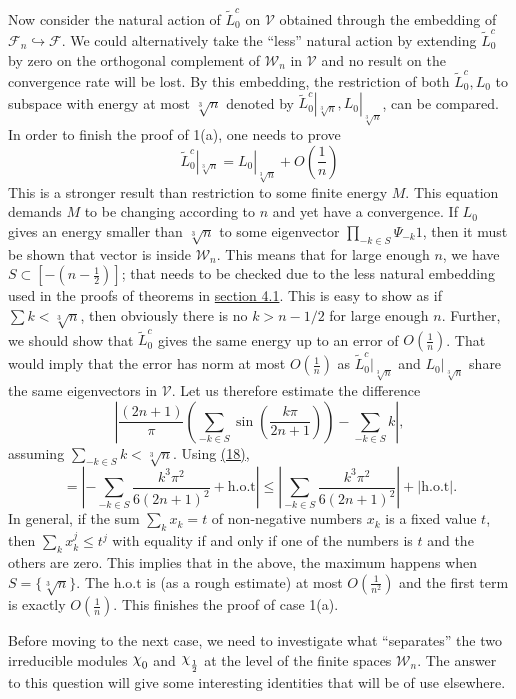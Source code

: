 \documentclass[twoside,11pt,titlepage]{amsart}
\renewcommand{\=}[1]{\stackrel{#1}{=}} %
\theoremstyle{definition}
\theoremstyle{remark}
\DeclareRobustCommand{\rchi}{{\mathpalette\irchi\relax}}
\newcommand{\irchi}[2]{\raisebox{\depth}{$#1\chi$}}
\begin{document}
Now consider the natural action of $\widetilde{L}_0^c$ on $\mathcal{V}$ obtained through the embedding of $\mathcal{F}_n \hookrightarrow \mathcal{F}$. We could alternatively take the ``less'' natural action by extending $\widetilde{L}_0^c$ by zero on the orthogonal complement of $\mathcal{W}_n$ in $\mathcal{V}$ and no result on the convergence rate will be lost. By this embedding, the restriction of both $\widetilde{L}_0^c,L_0$ to subspace with energy at most $\sqrt[3]{n}$ denoted by $\widetilde{L}_0^c|_{\sqrt[3]{n}},L_0|_{\sqrt[3]{n}}$, can be compared. In order to finish the proof of 1(a), one needs to prove
$$\widetilde{L}_0^c|_{\sqrt[3]{n}}=L_0|_{\sqrt[3]{n}}+O(\frac{1}{n})$$
This is a stronger result than restriction to some finite energy $M$. This equation demands $M$ to be changing according to $n$ and yet have a convergence. If $L_0$ gives an energy smaller than $\sqrt[3]{n}$ to some eigenvector $\prod_{-k \in S} \Psi_{-k} 1$, then it must be shown that vector is inside $\mathcal{W}_n$. This means that for large enough $n$, we have $S \subset [-(n-\frac{1}{2})]$; that needs to be checked due to the less natural embedding used in the proofs of theorems in \hyperref[4.1]{section 4.1}. This is easy to show as if $\sum k < \sqrt[3]{n}$, then obviously there is no $k>n-1/2$ for large enough $n$. Further, we should show that $\widetilde{L}_0^c$ gives the same energy up to an error of $O(\frac{1}{n})$. That would imply that the error has norm at most $O(\frac{1}{n})$ as $\widetilde{L}_0^c|_{\sqrt[3]{n}}$ and $L_0|_{\sqrt[3]{n}}$ share the same eigenvectors in $\mathcal{V}$. Let us therefore estimate the difference 
$$|\frac{(2n+1)}{\pi}(\sum_{-k \in S} \sin(\frac{k\pi}{2n+1}))-\sum_{-k \in S} k|,$$
assuming $\sum_{-k \in S}k < \sqrt[3]{n}$. Using \hyperref[eq18]{(18)},
$$=|-\sum_{-k \in S}\frac{k^3 \pi^2}{6(2n+1)^2}+\text{h.o.t}| \le |\sum_{-k \in S}\frac{k^3 \pi^2}{6(2n+1)^2}|+|\text{h.o.t}|.$$
In general, if the sum $\sum_k x_k=t$ of non-negative numbers $x_k$ is a fixed value $t$, then $\sum_k x_k^j \le t^j$ with equality if and only if one of the numbers is $t$ and the others are zero. This implies that in the above, the maximum happens when $S=\{\sqrt[3]{n}\}$. The $\text{h.o.t}$ is (as a rough estimate) at most $O(\frac{1}{n^2})$ and the first term is exactly $O(\frac{1}{n})$. This finishes the proof of case 1(a).

Before moving to the next case, we need to investigate what ``separates'' the two irreducible modules $\rchi_0$ and $\rchi_\frac{1}{2}$ at the level of the finite spaces $\mathcal{W}_n$. The answer to this question will give some interesting identities that will be of use elsewhere.
\end{document}
